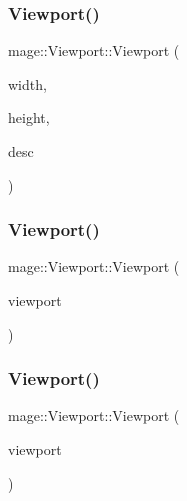 \subsubsection{\texorpdfstring{Viewport()}{Viewport()}\hspace{0.1cm}{\footnotesize\ttfamily [5/11]}}
{\footnotesize\ttfamily mage\+::\+Viewport\+::\+Viewport (\begin{DoxyParamCaption}\item[{\hyperlink{namespacemage_aa97e833b45f06d60a0a9c4fc22ae02c0}{F32}}]{width,  }\item[{\hyperlink{namespacemage_aa97e833b45f06d60a0a9c4fc22ae02c0}{F32}}]{height,  }\item[{\hyperlink{namespacemage_a86cd40b8f2f42ca4d616cc6ec665a7f2}{A\+A\+Descriptor}}]{desc }\end{DoxyParamCaption})\hspace{0.3cm}{\ttfamily [explicit]}}

\hypertarget{classmage_1_1_viewport_a30e0141573acb18a4f8b1ef0aa46c8e0}{}\label{classmage_1_1_viewport_a30e0141573acb18a4f8b1ef0aa46c8e0} 
\subsubsection{\texorpdfstring{Viewport()}{Viewport()}\hspace{0.1cm}{\footnotesize\ttfamily [6/11]}}
{\footnotesize\ttfamily mage\+::\+Viewport\+::\+Viewport (\begin{DoxyParamCaption}\item[{const D3\+D11\+\_\+\+V\+I\+E\+W\+P\+O\+RT \&}]{viewport }\end{DoxyParamCaption})\hspace{0.3cm}{\ttfamily [explicit]}}

\hypertarget{classmage_1_1_viewport_a44d0f073e593ce4db5c88fad276ffbcf}{}\label{classmage_1_1_viewport_a44d0f073e593ce4db5c88fad276ffbcf} 
\subsubsection{\texorpdfstring{Viewport()}{Viewport()}\hspace{0.1cm}{\footnotesize\ttfamily [7/11]}}
{\footnotesize\ttfamily mage\+::\+Viewport\+::\+Viewport (\begin{DoxyParamCaption}\item[{D3\+D11\+\_\+\+V\+I\+E\+W\+P\+O\+RT \&\&}]{viewport }\end{DoxyParamCaption})\hspace{0.3cm}{\ttfamily [explicit]}}

